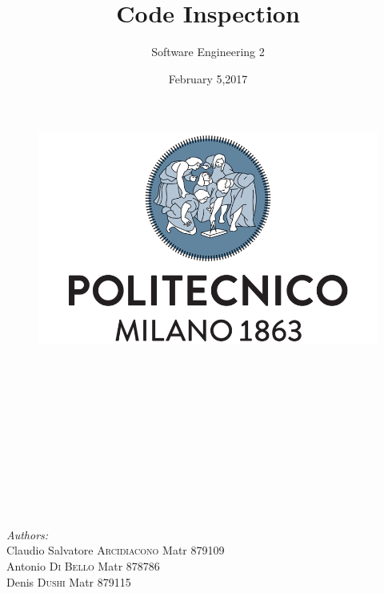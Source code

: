 \documentclass[a4paper]{article}
\title{Code Inspection}
\author{Software Engineering 2}
\date{February 5,2017}
\begin{document}
\maketitle

\begin{figure}[h]
  \centering
  \includegraphics[width=300 pt]{resources/polimi.png}
  \label{fig:polimi}
\end{figure}

\emph{\\}
\emph{\\}
\emph{\\}
\emph{\\}
\emph{\\}
\emph{\\}
\emph{\\}
\emph{\\}
\emph{\\}
\emph{\\}

\begin{minipage}{0.7\textwidth}
\begin{flushleft} \large
\emph{Authors:}\\
Claudio Salvatore \textsc{Arcidiacono} Matr 879109\\
Antonio \emph{ }\emph{ }\emph{ }\emph{ }\emph{ }\emph{ }\emph{ }\emph{ }\emph{ }\emph{ }\emph{ }\emph{ }\textsc{Di Bello} \emph{ }\emph{ }\emph{ }\emph{ } Matr 878786\\
Denis  \emph{ }\emph{ }\emph{ }\emph{ }\emph{ }\emph{ }\emph{ }\emph{ }\emph{ }\emph{ }\emph{ }\emph{ }\emph{ }\emph{ }\emph{ }\textsc{Dushi } \emph{ }\emph{ }\emph{ }\emph{ }\emph{ }\emph{ }\emph{ }\emph{ }\emph{ }Matr 879115
\end{flushleft}
\end{minipage}

\begin{minipage}{0.4\textwidth}

\end{minipage}
\end{document}
